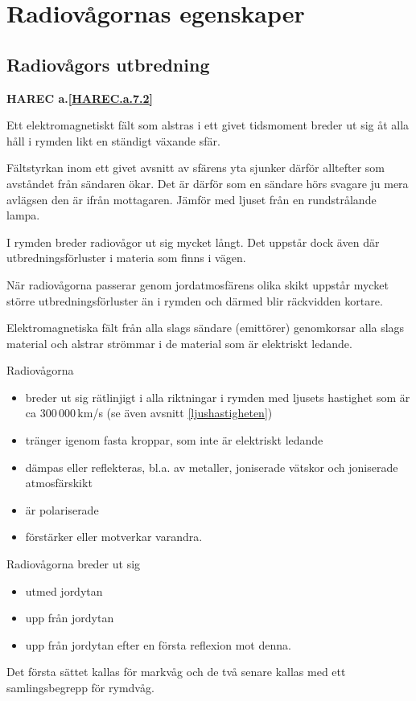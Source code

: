 \section{Radiovågornas egenskaper}
\label{radiovågornasegenskaper}

\subsection{Radiovågors utbredning}
\textbf{HAREC a.\ref{HAREC.a.7.2}\label{myHAREC.a.7.2}}

Ett elektromagnetiskt fält som alstras i ett givet tidsmoment breder
ut sig åt alla håll i rymden likt en ständigt växande sfär.

Fältstyrkan inom ett givet avsnitt av sfärens yta sjunker därför
alltefter som avståndet från sändaren ökar.
Det är därför som en sändare hörs svagare ju mera avlägsen den är ifrån
mottagaren.
Jämför med ljuset från en rundstrålande lampa.

I rymden breder radiovågor ut sig mycket långt. Det uppstår dock även
där utbredningsförluster i materia som finns i vägen.

När radiovågorna passerar genom jordatmosfärens olika skikt uppstår mycket
större utbredningsförluster än i rymden och därmed blir räckvidden kortare.

Elektromagnetiska fält från alla slags sändare (emittörer) genomkorsar alla
slags material och alstrar strömmar i de material som är elektriskt ledande.

Radiovågorna
\begin{itemize}
  \item breder ut sig rätlinjigt i alla riktningar i rymden med ljusets
  hastighet som är ca 300\,000\,km/s (se även avsnitt \ref{ljushastigheten})
  \item tränger igenom fasta kroppar, som inte är elektriskt ledande
  \item dämpas eller reflekteras, bl.a. av metaller, joniserade vätskor
  och joniserade atmosfärskikt
  \item är polariserade
  \item förstärker eller motverkar varandra.
\end{itemize}

Radiovågorna breder ut sig
\begin{itemize}
  \item utmed jordytan
  \item upp från jordytan
  \item upp från jordytan efter en första reflexion mot denna.
\end{itemize}
Det första sättet kallas för markvåg och de två senare kallas med ett
samlingsbegrepp för rymdvåg.

